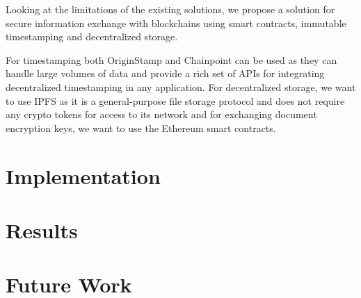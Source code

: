 \documentclass[]{report}
\begin{document}
		Looking at the limitations of the existing solutions, we propose a solution for secure information exchange  with blockchains using smart contracts, immutable timestamping and decentralized storage.
		
		For timestamping both OriginStamp and Chainpoint can be used as they can handle large volumes of data and provide a rich set of APIs for integrating decentralized timestamping in any application. For decentralized storage, we want to use IPFS as it is a general-purpose file storage protocol and does not require any crypto tokens for access to its network and for exchanging document encryption keys, we want to use the Ethereum smart contracts.
	
	\section*{Implementation}
		
	
	\section*{Results}
	
	\section*{Future Work}
	
	
	
\end{document}

